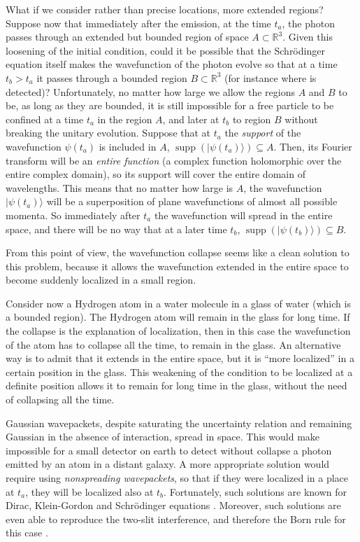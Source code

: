 \documentclass[11pt]{amsart}
\theoremstyle{definition}
\theoremstyle{plain}
\begin{document}
What if we consider rather than precise locations, more extended regions? Suppose now that immediately after the emission, at the time $t_a$, the photon passes through an extended but bounded region of space $A\subset\mathbb{R}^3$. Given this loosening of the initial condition, could it be possible that the Schr\"odinger equation itself makes the wavefunction of the photon evolve so that at a time $t_b>t_a$ it passes through a bounded region $B\subset\mathbb{R}^3$ (for instance where is detected)? Unfortunately, no matter how large we allow the regions $A$ and $B$ to be, as long as they are bounded, it is still impossible for a free particle to be confined at a time $t_a$ in the region $A$, and later at $t_b$ to region $B$ without breaking the unitary evolution. Suppose that at $t_a$ the \emph{support} of the wavefunction $\psi(t_a)$ is included in $A$, $\operatorname{supp}(|{\psi(t_a)}\rangle)\subseteq A$. Then, its Fourier transform will be an \emph{entire function} (a complex function holomorphic over the entire complex domain), so its support will cover the entire domain of wavelengths. This means that no matter how large is $A$, the wavefunction $|{\psi(t_a)}\rangle$ will be a superposition of plane wavefunctions of almost all possible momenta. So immediately after $t_a$ the wavefunction will spread in the entire space, and there will be no way that at a later time $t_b$, $\operatorname{supp}(|{\psi(t_b)}\rangle)\subseteq B$.

From this point of view, the wavefunction collapse seems like a clean solution to this problem, because it allows the wavefunction extended in the entire space to become suddenly localized in a small region.

Consider now a Hydrogen atom in a water molecule in a glass of water (which is a bounded region). The Hydrogen atom will remain in the glass for long time. If the collapse is the explanation of localization, then in this case the wavefunction of the atom has to collapse all the time, to remain in the glass. An alternative way is to admit that it extends in the entire space, but it is ``more localized'' in a certain position in the glass. This weakening of the condition to be localized at a definite position allows it to remain for long time in the glass, without the need of collapsing all the time.

Gaussian wavepackets, despite saturating the uncertainty relation and remaining Gaussian in the absence of interaction, spread in space. This would make impossible for a small detector on earth to detect without collapse a photon emitted by an atom in a distant galaxy.
A more appropriate solution would require using \emph{nonspreading wavepackets}, so that if they were localized in a place at $t_a$, they will be localized also at $t_b$.
Fortunately, such solutions are known for Dirac, Klein-Gordon and Schr\"odinger equations \cite{courant1966methods,ziolkowski1989space,shaarawi1990novel,Barut1990EequalHW,barut1990quantumParticleLike,hillion1992nondispersive,sheppard2002generalized,zamboni2012soliton}. Moreover, such solutions are even able to reproduce the two-slit interference, and therefore the Born rule for this case \cite{shaarawi1994diffraction}.
\end{document}
